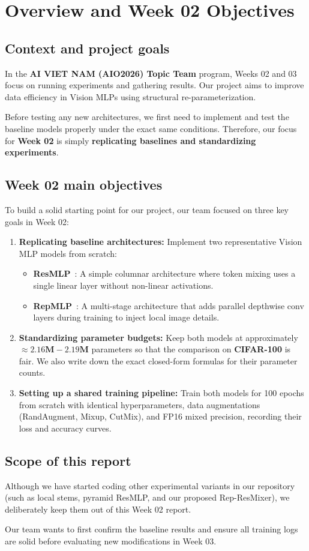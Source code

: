 \section{Overview and Week 02 Objectives}
\label{sec:overview}

\subsection{Context and project goals}
In the \textbf{AI VIET NAM (AIO2026) Topic Team} program, Weeks 02 and 03 focus on running experiments and gathering results. Our project aims to improve data efficiency in Vision MLPs using structural re-parameterization. 

Before testing any new architectures, we first need to implement and test the baseline models properly under the exact same conditions. Therefore, our focus for \textbf{Week 02} is simply \textbf{replicating baselines and standardizing experiments}.

\subsection{Week 02 main objectives}
To build a solid starting point for our project, our team focused on three key goals in Week 02:
\begin{enumerate}[label=\textbf{\arabic*.}]
    \item \textbf{Replicating baseline architectures:} Implement two representative Vision MLP models from scratch:
    \begin{itemize}
        \item \textbf{ResMLP}~\cite{touvron2021resmlp}: A simple columnar architecture where token mixing uses a single linear layer without non-linear activations.
        \item \textbf{RepMLP}~\cite{ding2022repmlp}: A multi-stage architecture that adds parallel depthwise conv layers during training to inject local image details.
    \end{itemize}
    \item \textbf{Standardizing parameter budgets:} Keep both models at approximately $\approx \mathbf{2.16\text{M} - 2.19\text{M}}$ parameters so that the comparison on \textbf{CIFAR-100} is fair. We also write down the exact closed-form formulas for their parameter counts.
    \item \textbf{Setting up a shared training pipeline:} Train both models for 100 epochs from scratch with identical hyperparameters, data augmentations (RandAugment, Mixup, CutMix), and FP16 mixed precision, recording their loss and accuracy curves.
\end{enumerate}

\subsection{Scope of this report}
Although we have started coding other experimental variants in our repository (such as local stems, pyramid ResMLP, and our proposed Rep-ResMixer), we deliberately keep them out of this Week 02 report. 

Our team wants to first confirm the baseline results and ensure all training logs are solid before evaluating new modifications in Week 03.
